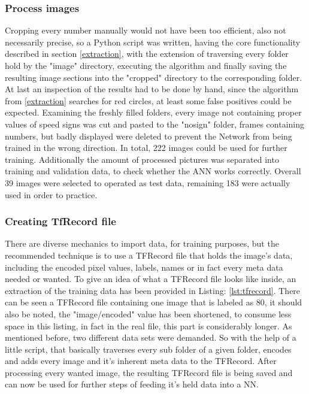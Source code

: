 \subsubsection{Process images}
Cropping every number manually would not have been too efficient, also not necessarily precise, so a Python script was written, having the core functionality described in section \ref{extraction}, with the extension of traversing every folder hold by the "image" directory, executing the algorithm and finally saving the resulting image sections into the "cropped" directory to the corresponding folder. At last an inspection of the results had to be done by hand, since the algorithm from \ref{extraction} searches for red circles, at least some false positives could be expected. Examining the freshly filled folders, every image not containing proper values of speed signs was cut and pasted to the "nosign" folder, frames containing numbers, but badly displayed were deleted to prevent the Network from being trained in the wrong direction. In total, 222 images could be used for further training. Additionally the amount of processed pictures was separated into training and validation data, to check whether the ANN works correctly. Overall 39 images were selected to operated as test data, remaining 183 were actually used in order to practice. 

\subsubsection{Creating TfRecord file}
There are diverse mechanics to import data, for training purposes, but the recommended technique is to use a TFRecord file \cite{tensorflowdata} that holds the image's data, including the encoded pixel values, labels, names or in fact every meta data needed or wanted. To give an idea of what a TFRecord file looks like inside, an extraction of the training data has been provided in Listing: \ref{lst:tfrecord}. There can be seen a TFRecord file containing one image that is labeled as 80, it should also be noted, the "image/encoded" value has been shortened, to consume less space in this listing, in fact in the real file, this part is considerably longer.\newline 
As mentioned before, two different data sets were demanded. So with the help of a little script, that basically traverses every sub folder of a given folder, encodes and adds every image and it's inherent meta data to the TFRecord. After processing every wanted image, the resulting TFRecord file is being saved and can now be used for further steps of feeding it's held data into a NN. 

